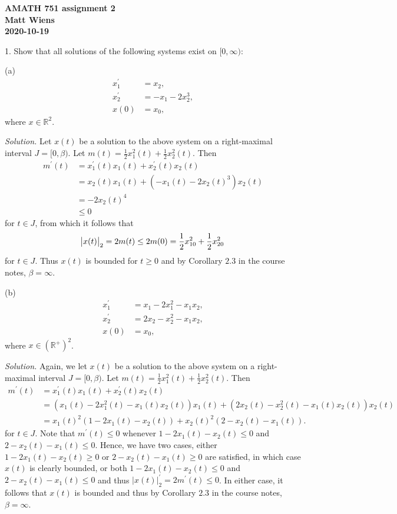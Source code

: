 \documentclass{article}
\newcommand{\R}{\mathbb{R}}
\begin{document}
\textbf{AMATH 751 assignment 2} \\
\textbf{Matt Wiens} \\
\textbf{2020-10-19}

1. Show that all solutions of the following systems exist on $[0, \infty)$:

(a)
%
\begin{align*}
    x_1^\prime &= x_2, \\
    x_2^\prime &= -x_1 - 2 x_2^3, \\
    x(0) &= x_0,
\end{align*}
%
where $x \in \R^2$.

\textit{Solution.}
Let $x(t)$ be a solution to the above system on a right-maximal
interval $J = [0, \beta)$. Let
$m(t) = \frac{1}{2} x_1^2(t) + \frac{1}{2} x_2^2(t)$. Then
%
\begin{align*}
    m^\prime(t)
        &= x_1^\prime(t) x_1(t) + x_2^\prime(t) x_2(t) \\
        &= x_2(t) x_1(t) + (-x_1(t) - 2 x_2(t)^3) x_2(t) \\
        &= - 2 x_2(t)^4 \\
        &\leq 0
\end{align*}
%
for $t \in J$, from which it follows that
%
\begin{equation*}
    \envert{x(t)}_2 = 2 m(t) \leq 2 m(0)
    = \frac{1}{2} x_{10}^2 + \frac{1}{2} x_{20}^2
\end{equation*}
%
for $t \in J$.
Thus $x(t)$ is bounded for $t \geq 0$ and by Corollary $2.3$ in the course notes, $\beta = \infty$.

\vspace{5mm}

(b)
%
\begin{align*}
    x_1^\prime &= x_1 - 2 x_1^2 - x_1 x_2, \\
    x_2^\prime &= 2 x_2 - x_2^2 - x_1 x_2, \\
    x(0) &= x_0,
\end{align*}
%
where $x \in (\R^+)^2$.

\textit{Solution.}
Again, we let $x(t)$ be a solution to the above system on a right-maximal
interval $J = [0, \beta)$. Let
$m(t) = \frac{1}{2} x_1^2(t) + \frac{1}{2} x_2^2(t)$. Then
%
\begin{align*}
    m^\prime(t)
        &= x_1^\prime(t) x_1(t) + x_2^\prime(t) x_2(t) \\
        &= (x_1(t) - 2 x_1^2(t) - x_1(t) x_2(t)) x_1(t)
            + (2 x_2(t) - x_2^2(t) - x_1(t) x_2(t)) x_2(t) \\
        &= x_1(t)^2 (1 - 2 x_1(t) - x_2(t))
            + x_2(t)^2 (2 - x_2(t) - x_1(t))
        .
\end{align*}
%
for $t \in J$.
Note that $m^\prime(t) \leq 0$ whenever $1 - 2 x_1(t) - x_2(t) \leq 0$
and $2 - x_2(t) - x_1(t) \leq 0$. Hence, we have two cases, either
$1 - 2 x_1(t) - x_2(t) \geq 0$
or $2 - x_2(t) - x_1(t) \geq 0$ are satisfied, in which case $x(t)$ is clearly bounded, or
both $1 - 2 x_1(t) - x_2(t) \leq 0$ and $2 - x_2(t) - x_1(t) \leq 0$ and thus
$|x(t)|_2^\prime = 2 m^\prime(t) \leq 0$. In either case, it follows that $x(t)$ is bounded and thus
by Corollary $2.3$ in the course notes, $\beta = \infty$.
\end{document}
